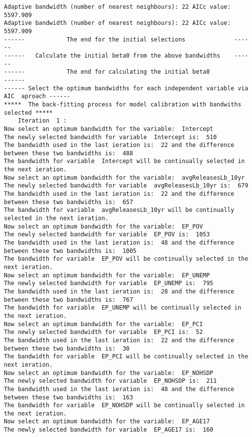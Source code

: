 \documentclass[
  12pt,
]{article}
\begin{document}
\begin{verbatim}
Adaptive bandwidth (number of nearest neighbours): 22 AICc value: 5597.909 
Adaptive bandwidth (number of nearest neighbours): 22 AICc value: 5597.909 
------            The end for the initial selections              ------
------   Calculate the initial beta0 from the above bandwidths    ------
------            The end for calculating the initial beta0              ------
------ Select the optimum bandwidths for each independent variable via  AIC  aproach ------
*****  The back-fitting process for model calibration with bandwiths selected *****
    Iteration  1 :
Now select an optimum bandwidth for the variable:  Intercept 
The newly selected bandwidth for variable  Intercept is:  510 
The bandwidth used in the last ieration is:  22 and the difference between these two bandwidths is:  488 
The bandwidth for variable  Intercept will be continually selected in the next ieration.
Now select an optimum bandwidth for the variable:  avgReleasesLb_10yr 
The newly selected bandwidth for variable  avgReleasesLb_10yr is:  679 
The bandwidth used in the last ieration is:  22 and the difference between these two bandwidths is:  657 
The bandwidth for variable  avgReleasesLb_10yr will be continually selected in the next ieration.
Now select an optimum bandwidth for the variable:  EP_POV 
The newly selected bandwidth for variable  EP_POV is:  1053 
The bandwidth used in the last ieration is:  48 and the difference between these two bandwidths is:  1005 
The bandwidth for variable  EP_POV will be continually selected in the next ieration.
Now select an optimum bandwidth for the variable:  EP_UNEMP 
The newly selected bandwidth for variable  EP_UNEMP is:  795 
The bandwidth used in the last ieration is:  28 and the difference between these two bandwidths is:  767 
The bandwidth for variable  EP_UNEMP will be continually selected in the next ieration.
Now select an optimum bandwidth for the variable:  EP_PCI 
The newly selected bandwidth for variable  EP_PCI is:  52 
The bandwidth used in the last ieration is:  22 and the difference between these two bandwidths is:  30 
The bandwidth for variable  EP_PCI will be continually selected in the next ieration.
Now select an optimum bandwidth for the variable:  EP_NOHSDP 
The newly selected bandwidth for variable  EP_NOHSDP is:  211 
The bandwidth used in the last ieration is:  48 and the difference between these two bandwidths is:  163 
The bandwidth for variable  EP_NOHSDP will be continually selected in the next ieration.
Now select an optimum bandwidth for the variable:  EP_AGE17 
The newly selected bandwidth for variable  EP_AGE17 is:  160 

\end{verbatim}
\end{document}
